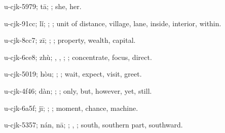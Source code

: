 \begin{multicols}{2}
{\cjkgGlue{}u-cjk-5979; tā; \cjkgGlue{}; she, her.

\cjkgGlue{}u-cjk-91cc; lǐ; \cjkgGlue{}; \cjkgGlue{}; unit of distance, village, lane, inside, interior, within.

\cjkgGlue{}u-cjk-8cc7; zī; \cjkgGlue{}; \cjkgGlue{}; property, wealth, capital.

\cjkgGlue{}u-cjk-6ce8; zhù; \cjkgGlue{}\cjkgGlue{}\cjkgGlue{}, \cjkgGlue{}\cjkgGlue{}\cjkgGlue{}, \cjkgGlue{}\cjkgGlue{}\cjkgGlue{}; \cjkgGlue{}; concentrate, focus, direct.

\cjkgGlue{}u-cjk-5019; hòu; \cjkgGlue{}; \cjkgGlue{}; wait, expect, visit, greet.

\cjkgGlue{}u-cjk-4f46; dàn; \cjkgGlue{}\cjkgGlue{}\cjkgGlue{}; \cjkgGlue{}; only, but, however, yet, still.

\cjkgGlue{}u-cjk-6a5f; jī; \cjkgGlue{}; \cjkgGlue{}; moment, chance, machine.

\cjkgGlue{}u-cjk-5357; nán, nā; \cjkgGlue{}; \cjkgGlue{}, \cjkgGlue{}; south, southern part, southward.

}
\end{multicols}

